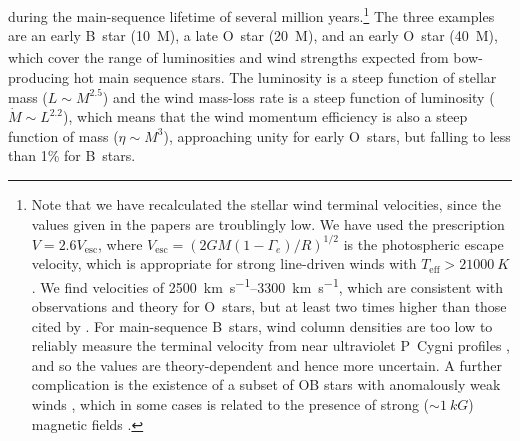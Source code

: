 during the main-sequence lifetime of several million years.\footnote{%
  \label{fn:meyer-velocities-too-low}
  Note that we have recalculated the stellar wind terminal velocities,
  since the values given in the \citeauthor{Meyer:2014b} papers are
  troublingly low.  We have used the prescription
  \(V = 2.6 V_{\text{esc}}\), where
  \(V_{\text{esc}} = \left( 2 G M (1 - \Gamma_e)/ R \right)^{1/2}\) is the
  photospheric escape velocity, which is appropriate for strong
  line-driven winds with \(T_{\text{eff}} > \SI{21 000}{K}\)
  \citep{Lamers:1995a}.  We find velocities of
  \SIrange{2500}{3300}{km.s^{-1}}, which are consistent with
  observations and theory \citep{Vink:1999a} for O~stars, but at least
  two times higher than those cited by \citet{Meyer:2014b}. For
  main-sequence B~stars, wind column densities are too low to reliably
  measure the terminal velocity from near ultraviolet P~Cygni profiles
  \citep{Prinja:1989a}, and so the values are theory-dependent
  \citep{Krticka:2014a} and hence more uncertain.  A further
  complication is the existence of a subset of OB stars with
  anomalously weak winds \citep{Puls:2008a}, which in some cases is
  related to the presence of strong (\(\sim \SI{1}{kG}\)) magnetic fields
  \citep{Oskinova:2011b}.} %
The three examples are an early B~star (\SI{10}{M_\odot}), a late O~star
(\SI{20}{M_\odot}), and an early O~star (\SI{40}{M_\odot}), which cover the
range of luminosities and wind strengths expected from bow-producing
hot main sequence stars.  The luminosity is a steep function of
stellar mass (\(L \sim M^{2.5}\)) and the wind mass-loss rate is a steep
function of luminosity (\(\dot{M} \sim L^{2.2}\)), which means that the
wind momentum efficiency is also a steep function of mass
(\(\eta \sim M^3\)), approaching unity for early O~stars, but falling to
less than 1\% for B~stars.

